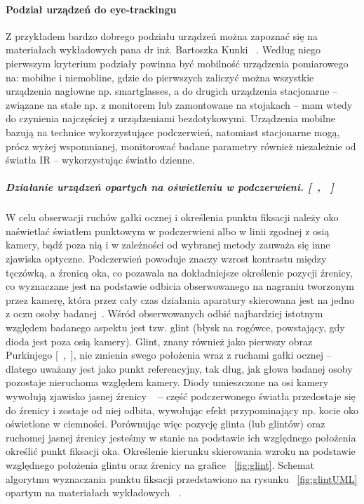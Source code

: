 \documentclass[twoside,a4paper]{book}
\begin{document}
\paragraph{Podział urządzeń do eye-trackingu}

Z przykładem bardzo dobrego podziału urządzeń można zapoznać się na materiałach wykładowych pana dr inż. Bartoszka Kunki ~\cite{kunkaFiksacja}. Według niego pierwszym kryterium podziały powinna być mobilność urządzenia pomiarowego na: mobilne i niemobline, gdzie do pierwszych zaliczyć można wszystkie urządzenia nagłowne np. smartglasses, a do drugich urządzenia stacjonarne – związane na stałe np. z monitorem lub zamontowane na stojakach – mam wtedy do czynienia najczęściej z urządzeniami bezdotykowymi. Urządzenia mobilne bazują na technice wykorzystujące podczerwień, natomiast stacjonarne mogą, prócz wyżej wspomnianej, monitorować badane parametry również niezależnie od światła  IR – wykorzystując światło dzienne. 

\subparagraph{Działanie urządzeń opartych na oświetleniu w podczerwieni. [~\cite{kunkaFiksacja}, ~\cite{erica}]}

W celu obserwacji ruchów gałki ocznej i określenia punktu fiksacji należy oko naświetlać światłem punktowym w podczerwieni albo w linii zgodnej z osią kamery, bądź poza nią i w zależności od wybranej metody zauważa się inne zjawiska optyczne. Podczerwień powoduje znaczy wzrost kontrastu między tęczówką, a źrenicą oka, co pozawala na dokładniejsze określenie pozycji źrenicy, co wyznaczane jest na podstawie odbicia obserwowanego na nagraniu tworzonym przez kamerę, która przez cały czas działania aparatury  skierowana jest na jedno z oczu osoby badanej~\cite{erica}.
Wśród obserwowanych odbić najbardziej istotnym względem badanego aspektu jest tzw. glint (błysk na rogówce, powstający, gdy dioda jest poza osią kamery). Glint, znany również jako  pierwszy obraz Purkinjego [~\cite{kunkaFiksacja},~\cite{erica}], nie zmienia swego położenia wraz z ruchami gałki ocznej – dlatego uważany jest jako punkt referencyjny, tak dług, jak głowa badanej osoby pozostaje nieruchoma względem kamery.  Diody umieszczone na osi kamery wywołują zjawisko jasnej źrenicy ~\cite{kunkaFiksacja} – część podczerwonego światła przedostaje się do źrenicy i zostaje od niej odbita, wywołując efekt  przypominający np. kocie oko oświetlone w ciemności.  Porównując więc pozycję glinta (lub glintów) oraz ruchomej jasnej źrenicy jesteśmy w stanie na podstawie ich względnego położenia określić punkt fiksacji oka. Określenie kierunku skierowania wzroku na podstawie względnego położenia glintu oraz źrenicy na grafice  ~\ref{fig:glint}. Schemat algorytmu wyznaczania punktu fiksacji przedstawiono na rysunku ~\ref{fig:glintUML} opartym na materiałach wykładowych ~\cite{kunkaFiksacja}.
\end{document}
